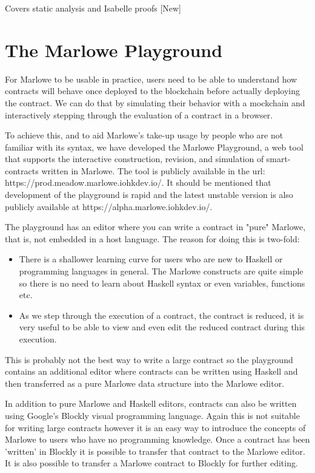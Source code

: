 \documentclass[runningheads]{llncs}
\begin{document}
Covers static analysis and Isabelle proofs [New]

\clearpage
\section{The Marlowe Playground}

For Marlowe to be usable in practice, users need to be able to understand how contracts will behave once deployed to the blockchain before actually deploying the contract. We can do that by simulating their behavior with a mockchain and interactively stepping through the evaluation of a contract in a browser.

To achieve this, and to aid Marlowe’s take-up usage by people who are not familiar with its syntax, we have developed the Marlowe Playground, a web tool that supports the interactive construction, revision, and simulation of smart-contracts written in Marlowe. The tool is publicly available in the url: https://prod.meadow.marlowe.iohkdev.io/. It should be mentioned that development of the playground is rapid and the latest unstable version is also publicly available at https://alpha.marlowe.iohkdev.io/.

The playground has an editor where you can write a contract in "pure" Marlowe, that is, not embedded in a host language. The reason for doing this is two-fold:
\begin{itemize}
    \item There is a shallower learning curve for users who are new to Haskell or programming languages in general. The Marlowe constructs are quite simple so there is no need to learn about Haskell syntax or even variables, functions etc.
    \item As we step through the execution of a contract, the contract is reduced, it is very useful to be able to view and even edit the reduced contract during this execution.
\end{itemize}
This is probably not the best way to write a large contract so the playground contains an additional editor where contracts can be written using Haskell and then transferred as a pure Marlowe data structure into the Marlowe editor.

In addition to pure Marlowe and Haskell editors, contracts can also be written using Google's Blockly visual programming language. Again this is not suitable for writing large contracts however it is an easy way to introduce the concepts of Marlowe to users who have no programming knowledge. Once a contract has been 'written' in Blockly it is possible to transfer that contract to the Marlowe editor. It is also possible to transfer a Marlowe contract to Blockly for further editing.
\end{document}
